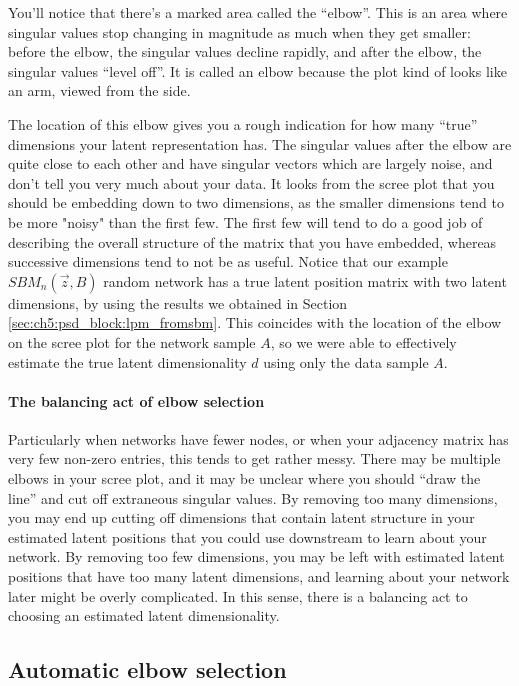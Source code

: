 You'll notice that there's a marked area called the ``elbow''. This is an area where singular values stop changing in magnitude as much when they get smaller: before the elbow, the singular values decline rapidly, and after the elbow, the singular values ``level off''. It is called an elbow because the plot kind of looks like an arm, viewed from the side.

The location of this elbow gives you a rough indication for how many ``true'' dimensions your latent representation has. The singular values after the elbow are quite close to each other and have singular vectors which are largely noise, and don't tell you very much about your data. It looks from the scree plot that you should be embedding down to two dimensions, as the smaller dimensions tend to be more "noisy" than the first few. The first few will tend to do a good job of describing the overall structure of the matrix that you have embedded, whereas successive dimensions tend to not be as useful. Notice that our example $SBM_n(\vec z, B)$ random network has a true latent position matrix with two latent dimensions, by using the results we obtained in Section \ref{sec:ch5:psd_block:lpm_fromsbm}. This coincides with the location of the elbow on the scree plot for the network sample $A$, so we were able to effectively estimate the true latent dimensionality $d$ using only the data sample $A$. 

\paragraph*{The balancing act of elbow selection}

Particularly when networks have fewer nodes, or when your adjacency matrix has very few non-zero entries, this tends to get rather messy. There may be multiple elbows in your scree plot, and it may be unclear where you should ``draw the line'' and cut off extraneous singular values. By removing too many dimensions, you may end up cutting off dimensions that contain latent structure in your estimated latent positions that you could use downstream to learn about your network. By removing too few dimensions, you may be left with estimated latent positions that have too many latent dimensions, and learning about your network later might be overly complicated. In this sense, there is a balancing act to choosing an estimated latent dimensionality.

\subsection{Automatic elbow selection}


